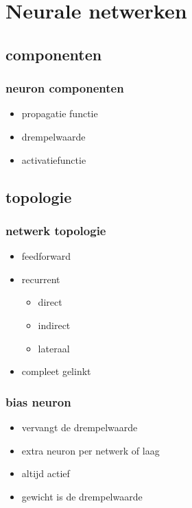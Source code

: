 \documentclass{beamer}
\begin{document}
\section{Neurale netwerken}
\subsection{componenten}
\begin{frame}
  \frametitle{neuron componenten}
  \begin{itemize}
    \item<+-> propagatie functie
    \item<+-> drempelwaarde
    \item<+-> activatiefunctie
  \end{itemize}
\end{frame}
\subsection{topologie}
\begin{frame}
  \frametitle{netwerk topologie}
  \begin{itemize}
    \item<+-> feedforward
    \item<+-> recurrent
      \begin{itemize}
        \item direct
        \item indirect
        \item lateraal
      \end{itemize}
    \item<+-> compleet gelinkt
  \end{itemize}
\end{frame}
\begin{frame}
  \frametitle{bias neuron}
  \begin{itemize}
    \item<+-> vervangt de drempelwaarde
    \item<+-> extra neuron per netwerk of laag
    \item<+-> altijd actief
    \item<+-> gewicht is de drempelwaarde
  \end{itemize}
\end{frame}
\end{document}
